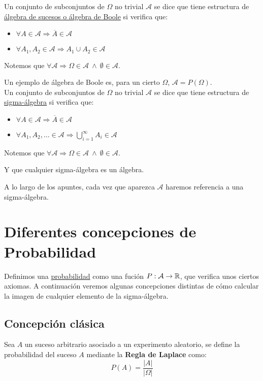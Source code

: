 Un conjunto de subconjuntos de $\Omega$ no trivial $\mathcal{A}$ se dice que tiene estructura de
\underline{álgebra de sucesos o álgebra de Boole} si verifica que:
\begin{itemize}
  \item $\forall A \in \mathcal{A} \Rightarrow \overline{A} \in \mathcal{A}$
  \item $\forall A_1, A_2 \in \mathcal{A} \Rightarrow A_1 \cup A_2 \in \mathcal{A}$
\end{itemize}

Notemos que $\forall \mathcal{A} \Rightarrow \Omega \in \mathcal{A} \ \land \ \emptyset \in \mathcal{A}$.

Un ejemplo de álgebra de Boole es, para un cierto $\Omega$, $\mathcal{A} = P(\Omega)$.\\

Un conjunto de subconjuntos de $\Omega$ no trivial $\mathcal{A}$ se dice que tiene estructura de
\underline{sigma-álgebra} si verifica que:
\begin{itemize}
  \item $\forall A \in \mathcal{A} \Rightarrow \overline{A} \in \mathcal{A}$
  \item $\forall A_1, A_2, \ldots \in \mathcal{A} \Rightarrow \bigcup\limits_{i=1}^\infty A_i \in \mathcal{A}$
\end{itemize}

Notemos que $\forall \mathcal{A} \Rightarrow \Omega \in \mathcal{A} \ \land \ \emptyset \in \mathcal{A}$.

Y que cualquier sigma-álgebra es un álgebra.

A lo largo de los apuntes, cada vez que aparezca $\mathcal{A}$ haremos referencia a una sigma-álgebra.

\section{Diferentes concepciones de Probabilidad}

Definimos una \underline{probabilidad} como una fución $P: \mathcal{A} \rightarrow \mathbb R$, que verifica
unos ciertos axiomas. A continuación veremos algunas concepciones distintas de cómo calcular la imagen
de cualquier elemento de la sigma-álgebra.

\subsection{Concepción clásica}

Sea $A$ un suceso arbitrario asociado a un experimento aleatorio, se define la probabilidad del suceso $A$ mediante la \textbf{Regla de Laplace} como: $$P(A) = \dfrac{|A|}{|\Omega|}$$

